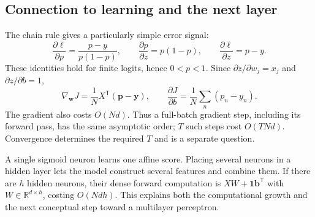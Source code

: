 \subsection{Connection to learning and the next layer}
The chain rule gives a particularly simple error signal:
\[
 \frac{\partial\ell}{\partial p}=\frac{p-y}{p(1-p)},\qquad
 \frac{\partial p}{\partial z}=p(1-p),\qquad
 \frac{\partial\ell}{\partial z}=p-y.
\]
These identities hold for finite logits, hence $0<p<1$. Since $\partial z/\partial w_j=x_j$ and $\partial z/\partial b=1$,
\[
 \nabla_{\mathbf{w}}J=\frac1N X^{\mathsf T}(\mathbf{p}-\mathbf{y}),\qquad
 \frac{\partial J}{\partial b}=\frac1N\sum_n(p_n-y_n).
\]
The gradient also costs $O(Nd)$. Thus a full-batch gradient step, including its forward pass, has the same asymptotic order; $T$ such steps cost $O(TNd)$. Convergence determines the required $T$ and is a separate question.

A single sigmoid neuron learns one affine score. Placing several neurons in a hidden layer lets the model construct several features and combine them. If there are $h$ hidden neurons, their dense forward computation is $XW+\mathbf{1}\mathbf{b}^{\mathsf T}$ with $W\in\mathbb{R}^{d\times h}$, costing $O(Ndh)$. This explains both the computational growth and the next conceptual step toward a multilayer perceptron.
